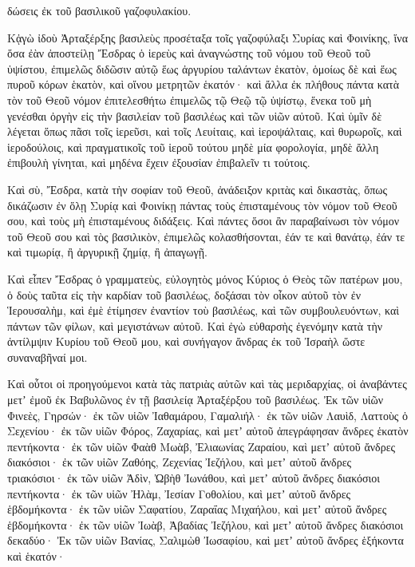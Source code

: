 {δώσεις ἐκ τοῦ βασιλικοῦ γαζοφυλακίου.
\par }{\PP {}Κᾀγὼ ἰδοὺ Ἀρταξέρξης βασιλεὺς προσέταξα τοῖς γαζοφύλαξι Συρίας καὶ Φοινίκης, ἵνα ὅσα ἐὰν ἀποστείλῃ Ἔσδρας ὁ ἱερεὺς καὶ ἀναγνώστης τοῦ νόμου τοῦ Θεοῦ τοῦ ὑψίστου, ἐπιμελῶς διδῶσιν αὐτῷ ἕως ἀργυρίου ταλάντων ἑκατὸν,
ὁμοίως δὲ καὶ ἕως πυροῦ κόρων ἑκατὸν, καὶ οἴνου μετρητῶν ἑκατόν·
καὶ ἄλλα ἐκ πλήθους πάντα κατὰ τὸν τοῦ Θεοῦ νόμον ἐπιτελεσθήτω ἐπιμελῶς τῷ Θεῷ τῷ ὑψίστῳ, ἕνεκα τοῦ μὴ γενέσθαι ὀργὴν εἰς τὴν βασιλείαν τοῦ βασιλέως καὶ τῶν υἱῶν αὐτοῦ.
Καὶ ὑμῖν δὲ λέγεται ὅπως πᾶσι τοῖς ἱερεῦσι, καὶ τοῖς Λευίταις, καὶ ἱεροψάλταις, καὶ θυρωροῖς, καὶ ἱεροδούλοις, καὶ πραγματικοῖς τοῦ ἱεροῦ τούτου μηδὲ μία φορολογία, μηδὲ ἄλλη ἐπιβουλὴ γίνηται, καὶ μηδένα ἔχειν ἐξουσίαν ἐπιβαλεῖν τι τούτοις.
\par }{\PP {}Καὶ σὺ, Ἔσδρα, κατὰ τὴν σοφίαν τοῦ Θεοῦ, ἀνάδειξον κριτὰς καὶ δικαστὰς, ὅπως δικάζωσιν ἐν ὅλῃ Συρίᾳ καὶ Φοινίκῃ πάντας τοὺς ἐπισταμένους τὸν νόμον τοῦ Θεοῦ σου, καὶ τοὺς μὴ ἐπισταμένους διδάξεις.
Καὶ πάντες ὅσοι ἂν παραβαίνωσι τὸν νόμον τοῦ Θεοῦ σου καὶ τὸς βασιλικὸν, ἐπιμελῶς κολασθήσονται, ἐάν τε καὶ θανάτῳ, ἐάν τε καὶ τιμωρίᾳ, ἢ ἀργυρικῇ ζημίᾳ, ἢ ἀπαγωγῇ.
\par }{\PP {}Καὶ εἶπεν Ἔσδρας ὁ γραμματεὺς, εὐλογητὸς μόνος Κύριος ὁ Θεὸς τῶν πατέρων μου, ὁ δοὺς ταῦτα εἰς τὴν καρδίαν τοῦ βασιλέως, δοξάσαι τὸν οἶκον αὐτοῦ τὸν ἐν Ἱερουσαλὴμ,
καὶ ἐμὲ ἐτίμησεν ἐναντίον τοὺ βασιλέως, καὶ τῶν συμβουλευόντων, καὶ πάντων τῶν φίλων, καὶ μεγιστάνων αὐτοῦ.
Καὶ ἐγὼ εὐθαρσὴς ἐγενόμην κατὰ τὴν ἀντίλμψιν Κυρίου τοῦ Θεοῦ μου, καὶ συνήγαγον ἄνδρας ἐκ τοῦ Ἰσραὴλ ὥστε συναναβῆναί μοι.
\par }{\PP {}Καὶ οὗτοι οἱ προηγούμενοι κατὰ τὰς πατριὰς αὐτῶν καὶ τὰς μεριδαρχίας, οἱ ἀναβάντες μετʼ ἐμοῦ ἐκ Βαβυλῶνος ἐν τῇ βασιλείᾳ Ἀρταξέρξου τοῦ βασιλέως.
Ἐκ τῶν υἱῶν Φινεὲς, Γηρσών· ἐκ τῶν υἱῶν Ἰαθαμάρου, Γαμαλιήλ· ἐκ τῶν υἱῶν Λαυὶδ, Λαττοὺς ὁ Σεχενίου·
ἐκ τῶν υἱῶν Φόρος, Ζαχαρίας, καὶ μετʼ αὐτοῦ ἀπεγράφησαν ἄνδρες ἑκατὸν πεντήκοντα·
ἐκ τῶν υἱῶν Φαὰθ Μωὰβ, Ἐλιαωνίας Ζαραίου, καὶ μετʼ αὐτοῦ ἄνδρες διακόσιοι·
ἐκ τῶν υἱῶν Ζαθόης, Ζεχενίας Ἰεζήλου, καὶ μετʼ αὐτοῦ ἄνδρες τριακόσιοι· ἐκ τῶν υἱῶν Ἀδὶν, Ὠβὴθ Ἰωνάθου, καὶ μετʼ αὐτοῦ ἄνδρες διακόσιοι πεντήκοντα·
ἐκ τῶν υἱῶν Ἠλὰμ, Ἰεσίαν Γοθολίου, καὶ μετʼ αὐτοῦ ἄνδρες ἑβδομήκοντα·
ἐκ τῶν υἱῶν Σαφατίου, Ζαραΐας Μιχαήλου, καὶ μετʼ αὐτοῦ ἄνδρες ἑβδομήκοντα·
ἐκ τῶν υἱῶν Ἰωὰβ, Ἀβαδίας Ἰεζήλου, καὶ μετʼ αὐτοῦ ἄνδρες διακόσιοι δεκαδύο·
Ἐκ τῶν υἱῶν Βανίας, Σαλιμὼθ Ἰωσαφίου, καὶ μετʼ αὐτοῦ ἄνδρες ἑξήκοντα καὶ ἑκατόν·
}
